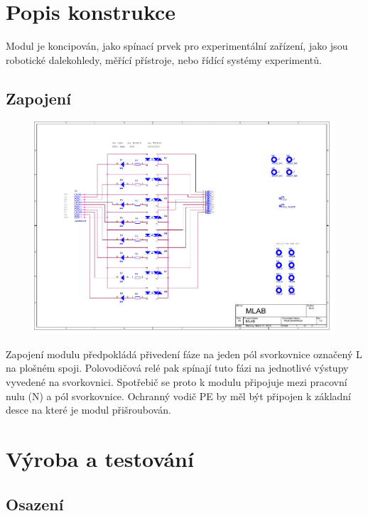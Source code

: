 \documentclass[12pt,a4paper,oneside]{article}
\begin{document}
\newpage
\section{Popis konstrukce}

Modul je koncipován, jako spínací prvek pro experimentální zařízení, jako jsou robotické dalekohledy, měřící přístroje, nebo řídící systémy experimentů. 

\subsection{Zapojení}

\begin{figure} [htbp]
  \includegraphics[trim = 5mm 30mm 120mm 15mm, clip, width=15cm]{../../SCH/TRIACSHARP02A.pdf}
\end{figure}

Zapojení modulu předpokládá přivedení fáze na jeden pól svorkovnice označený L na plošném spoji. Polovodičová relé pak spínají tuto fázi na jednotlivé výstupy vyvedené na svorkovnici. Spotřebič se proto k modulu připojuje mezi pracovní nulu (N) a pól svorkovnice. Ochranný vodič PE by měl být připojen k základní desce na které je modul přišroubován. 

\section{Výroba a testování}

\subsection{Osazení}
\end{document}
